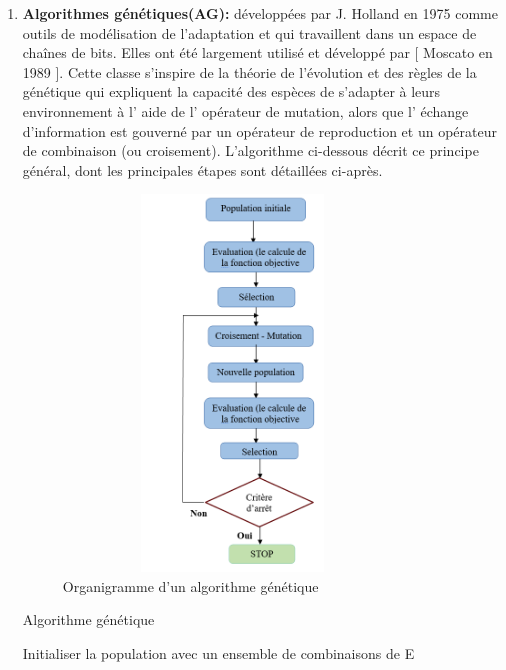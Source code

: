 \begin{enumerate}[label=\alph*)]
	\item \textbf{Algorithmes génétiques(AG):} développées par J. Holland en 1975 \cite{holland1975adaptation} comme outils de modélisation de l’adaptation et qui travaillent dans un espace de chaînes de bits. Elles ont été largement utilisé et développé par [ Moscato en 1989 \cite{moscato1989evolution} ]. Cette classe s’inspire de la théorie de l’évolution et des règles de la génétique qui expliquent la capacité des espèces de s’adapter à leurs environnement à l’ aide de l’ opérateur de mutation, alors que l’ échange d’information est gouverné par un opérateur de reproduction et un opérateur de combinaison (ou croisement). L’algorithme ci-dessous décrit ce principe général, dont les principales étapes sont détaillées ci-après.\\

\begin{figure}[H]
	\centering
	\includegraphics[width=9cm,height=10cm]{Chap2/6.png}
	\caption{Organigramme d’un algorithme génétique}
	\label{fig:OAG}
\end{figure}

\begin{algorithm}[H]
\caption{Algorithme génétique}
\SetAlgoLined
\DontPrintSemicolon

Initialiser la population avec un ensemble de combinaisons de E \;


\end{algorithm}
\end{enumerate}
